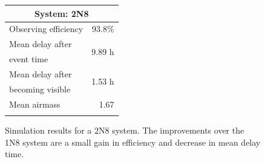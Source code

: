 \begin{colsection}
\begin{colsection}
\begin{figure}[p]
\begin{center}
    \begin{minipage}[t]{0.35\textwidth}\vspace{0pt}
    \begin{tabular}{lr}
    \multicolumn{2}{c}{\textbf{System: 2N8}} \\
    \midrule
    Observing efficiency & 93.8\% \\
    \midrule
    Mean delay after     & \multirow{2}{*}{9.89 h} \\
    event time           & \\
    Mean delay after     & \multirow{2}{*}{1.53 h} \\
    becoming visible     & \\
    \midrule
    Mean airmass         & 1.67 \\
    & \\
    \end{tabular}
    \vfill
    \end{minipage}

    \end{center}
    \caption[GW simulation results: 2N8 system]{
        Simulation results for a 2N8 system. The improvements over the 1N8 system are a small gain in efficiency and decrease in mean delay time.
    }\label{fig:gw_sim_2n8}
\end{figure}


\begin{figure}[p]
    \begin{center}


\end{center}
\end{figure}
\end{colsection}
\end{colsection}
